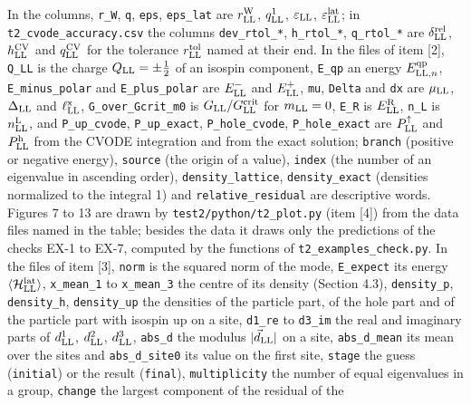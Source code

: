 \documentclass[
  10pt,
]{article}
\begin{document}
In the columns, \texttt{r\_W}, \texttt{q}, \texttt{eps},
\texttt{eps\_lat} are \(r^{\rm W}_{\rm LL}\), \(q^1_{\rm LL}\),
\(\varepsilon_{\rm LL}\), \(\varepsilon^{\rm lat}_{\rm LL}\); in
\texttt{t2\_cvode\_accuracy.csv} the columns \texttt{dev\_rtol\_*},
\texttt{h\_rtol\_*}, \texttt{q\_rtol\_*} are
\(\delta^{\rm rel}_{\rm LL}\), \(h^{\rm CV}_{\rm LL}\) and
\(q^{\rm CV}_{\rm LL}\) for the tolerance \(r^{\rm tol}_{\rm LL}\) named
at their end. In the files of item {[}2{]}, \texttt{Q\_LL} is the charge
\(Q_{\rm LL}=\pm\tfrac12\) of an isospin component, \texttt{E\_qp} an
energy \(E^{\rm qp}_{{\rm LL},n}\), \texttt{E\_minus\_polar} and
\texttt{E\_plus\_polar} are \(E^-_{\rm LL}\) and \(E^+_{\rm LL}\),
\texttt{mu}, \texttt{Delta} and \texttt{dx} are \(\mu_{\rm LL}\),
\(\Delta_{\rm LL}\) and \(\ell^{\rm x}_{\rm LL}\),
\texttt{G\_over\_Gcrit\_m0} is \(G_{\rm LL}/G^{\rm crit}_{\rm LL}\) for
\(m_{\rm LL}=0\), \texttt{E\_R} is \(E^{\rm R}_{\rm LL}\), \texttt{n\_L}
is \(n^{\rm L}_{\rm LL}\), and \texttt{P\_up\_cvode},
\texttt{P\_up\_exact}, \texttt{P\_hole\_cvode}, \texttt{P\_hole\_exact}
are \(P^\uparrow_{\rm LL}\) and \(P^{\rm h}_{\rm LL}\) from the CVODE
integration and from the exact solution; \texttt{branch} (positive or
negative energy), \texttt{source} (the origin of a value),
\texttt{index} (the number of an eigenvalue in ascending order),
\texttt{density\_lattice}, \texttt{density\_exact} (densities normalized
to the integral 1) and \texttt{relative\_residual} are descriptive
words. Figures 7 to 13 are drawn by \texttt{test2/python/t2\_plot.py}
(item {[}4{]}) from the data files named in the table; besides the data
it draws only the predictions of the checks EX-1 to EX-7, computed by
the functions of \texttt{t2\_examples\_check.py}. In the files of item
{[}3{]}, \texttt{norm} is the squared norm of the mode,
\texttt{E\_expect} its energy
\(\langle\mathcal H^{\rm lat}_{\rm LL}\rangle\), \texttt{x\_mean\_1} to
\texttt{x\_mean\_3} the centre of its density (Section 4.3),
\texttt{density\_p}, \texttt{density\_h}, \texttt{density\_up} the
densities of the particle part, of the hole part and of the particle
part with isospin up on a site, \texttt{d1\_re} to \texttt{d3\_im} the
real and imaginary parts of \(d^1_{\rm LL}\), \(d^2_{\rm LL}\),
\(d^3_{\rm LL}\), \texttt{abs\_d} the modulus
\(\lvert\vec d_{\rm LL}\rvert\) on a site, \texttt{abs\_d\_mean} its
mean over the sites and \texttt{abs\_d\_site0} its value on the first
site, \texttt{stage} the guess (\texttt{initial}) or the result
(\texttt{final}), \texttt{multiplicity} the number of equal eigenvalues
in a group, \texttt{change} the largest component of the residual of the
\end{document}
